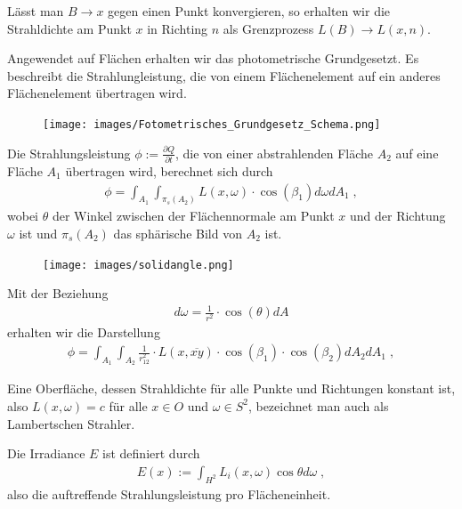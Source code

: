 Lässt man $B \to x$ gegen einen Punkt konvergieren, so erhalten wir die Strahldichte  am Punkt $x$ in Richting $n$ als Grenzprozess  $L(B) \to L(x, n)$.


Angewendet  auf Flächen erhalten wir das  photometrische Grundgesetzt. Es beschreibt die Strahlungleistung, die von einem  Flächenelement auf ein anderes  Flächenelement übertragen wird.

   \begin{figure}[H] 
    \centering
  
    \texttt{[image: images/Fotometrisches\_Grundgesetz\_Schema.png]}
    \label{fig:shadowmap1}
      \end{figure}
  


\begin{Satz}
Die Strahlungsleistung $\phi:= \frac{ \partial Q}{\partial t}$, die von einer abstrahlenden Fläche $A_2$  auf eine Fläche $A_1$ übertragen wird, berechnet sich durch
\begin{align}
\phi = \int_{A_1} \int_{\pi_s(A_2)} L(x, \omega)\cdot \cos(\beta_1) d\omega  dA_1   \; ,
\end{align}
wobei $\theta$ der Winkel zwischen der Flächennormale am Punkt $x$ und der Richtung $\omega$ ist und $\pi_s(A_2)$ das sphärische Bild von $A_2$ ist.
\end{Satz}

\begin{figure}[H]
        \centering
         \texttt{[image: images/solidangle.png]}
    \label{fig:shadowmap3}
\end{figure}
Mit der Beziehung \begin{align}
d\omega =  \frac{1}{r^2} \cdot  \cos(\theta) dA
\end{align}     
erhalten wir die Darstellung
\begin{align}
\phi = \int_{A_1} \int_{A_2} \frac{1}{r_{12}^2}  \cdot L(x, \overline{xy}) \cdot \cos(\beta_1) \cdot \cos(\beta_2)  d A_2 dA_1 \; ,
\end{align}

\begin{Definition}
Eine Oberfläche, dessen Strahldichte für alle Punkte und Richtungen konstant ist, also
$L(x, \omega) = c$  für alle $x \in O$ und $\omega \in S^2$, bezeichnet man auch als Lambertschen Strahler. 
\end{Definition}

\begin{Definition}
Die Irradiance $E$ ist definiert durch
\begin{align}
E(x) := \int_{H^2} L_i(x, \omega) \cos{\theta} d\omega \; ,
\end{align}
also die auftreffende Strahlungsleistung pro Flächeneinheit. 
\end{Definition}

